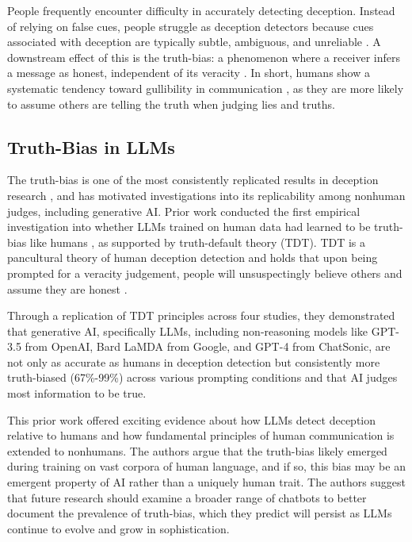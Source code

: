 \documentclass{article}
\begin{document}
People frequently encounter difficulty in accurately detecting deception. Instead of relying on false cues, people struggle as deception detectors because cues associated with deception are typically subtle, ambiguous, and unreliable \citep{depaulo_cues_2003, hartwig_why_2011}. A downstream effect of this is the truth-bias: a phenomenon where a receiver infers a message as honest, independent of its veracity \citep{levine_truth-default_2014, mccornack_deception_1986}. In short, humans show a systematic tendency toward gullibility in communication \citep{levine_duped_2020}, as they are more likely to assume others are telling the truth when judging lies and truths.

\subsection{Truth-Bias in LLMs}

The truth-bias is one of the most consistently replicated results in deception research \citep{levine_duped_2020}, and has motivated investigations into its replicability among nonhuman judges, including generative AI. Prior work conducted the first empirical investigation into whether LLMs trained on human data had learned to be truth-bias like humans \citep{markowitz_generative_2024}, as supported by truth-default theory (TDT). TDT is a pancultural theory of human deception detection and holds that upon being prompted for a veracity judgement, people will unsuspectingly believe others and assume they are honest \citep{levine_duped_2020, levine_truth-default_2014}. %

Through a replication of TDT principles across four studies, they demonstrated that generative AI, specifically LLMs, including non-reasoning models like GPT-3.5 from OpenAI, Bard LaMDA from Google, and GPT-4 from ChatSonic, are not only as accurate as humans in deception detection but consistently more truth-biased (67\%-99\%) across various prompting conditions and that AI judges most information to be true.

This prior work offered exciting evidence about how LLMs detect deception relative to humans and how fundamental principles of human communication is extended to nonhumans. The authors argue that the truth-bias likely emerged during training on vast corpora of human language, and if so, this bias may be an emergent property of AI rather than a uniquely human trait. The authors suggest that future research should examine a broader range of chatbots to better document the prevalence of truth-bias, which they predict will persist as LLMs continue to evolve and grow in sophistication.
\end{document}
